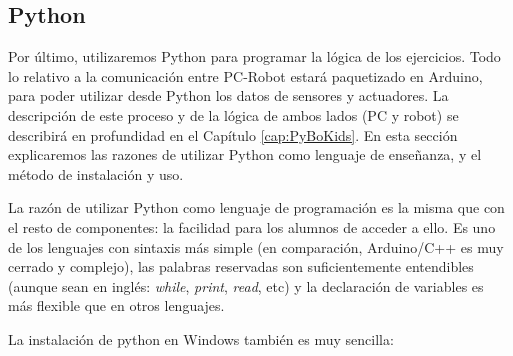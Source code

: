 \subsection{Python}\label{subsec:python}
Por último, utilizaremos Python\cite{PythonRef} para programar la lógica de los ejercicios. Todo lo relativo a la comunicación entre PC-Robot estará paquetizado en Arduino, para poder utilizar desde Python los datos de sensores y actuadores. La descripción de este proceso y de la lógica de ambos lados (PC y robot) se describirá en profundidad en el Capítulo \ref{cap:PyBoKids}. En esta sección explicaremos las razones de utilizar Python como lenguaje de enseñanza, y el método de instalación y uso. 
\par La razón de utilizar Python como lenguaje de programación es la misma que con el resto de componentes: la facilidad para los alumnos de acceder a ello. Es uno de los lenguajes con sintaxis más simple (en comparación, Arduino/C++ es muy cerrado y complejo), las palabras reservadas son suficientemente entendibles (aunque sean en inglés: \textit{while}, \textit{print}, \textit{read}, etc) y la declaración de variables es más flexible que en otros lenguajes.
\par La instalación de python en Windows también es muy sencilla:
